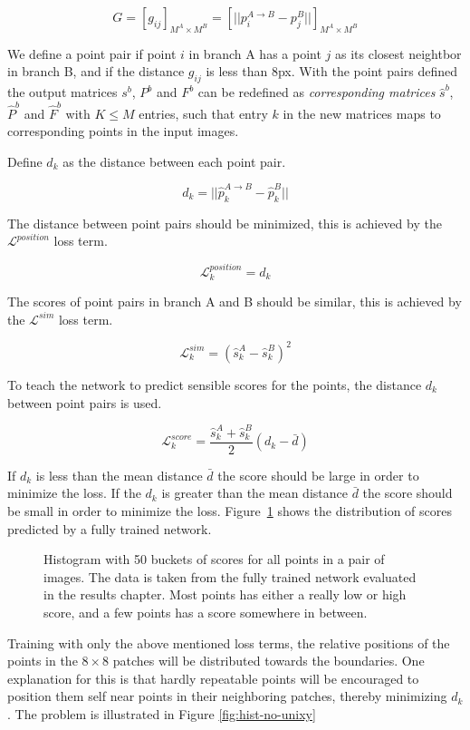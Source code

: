 \[
G=[g_{ij}]_{M^A\times M^B}=\left[||p_i^{A\rightarrow B}-p_j^B||\right]_{M^A\times M^B}
\]

We define a point pair if point $i$ in branch A has a point $j$ as its closest neightbor in branch B, and if the distance $g_{ij}$ is less than 8px. With the point pairs defined the output matrices $s^b$, $P^b$ and $F^b$ can be redefined as \textit{corresponding matrices} $\hat{s}^b$, $\hat{P}^b$ and $\hat{F}^b$ with $K\le M$ entries, such that entry $k$ in the new matrices maps to corresponding points in the input images.

Define $d_k$ as the distance between each point pair.

\[
d_k=||\hat{p}_k^{A\rightarrow B}-\hat{p}_k^B||
\]

The distance between point pairs should be minimized, this is achieved by the $\mathcal{L}^{position}$ loss term.

\[
\mathcal{L}_k^{position} = d_k
\]

The scores of point pairs in branch A and B should be similar, this is achieved by the $\mathcal{L}^{sim}$ loss term.

\[
\mathcal{L}_k^{sim} = \left(\hat{s}_k^{A}-\hat{s}_k^B\right)^2
\]

To teach the network to predict sensible scores for the points, the distance $d_k$ between point pairs is used.

\[
\mathcal{L}_k^{score}=\frac{\hat{s}_k^A+\hat{s}_k^B}{2}\left(d_k-\bar{d}\right)
\]

If $d_k$ is less than the mean distance $\bar{d}$ the score should be large in order to minimize the loss. If the $d_k$ is greater than the mean distance $\bar{d}$ the score should be small in order to minimize the loss. Figure~\ref{fig:score-hist} shows the distribution of scores predicted by a fully trained network.

\begin{figure}[H]
	\begin{center}
		
	\end{center}
	\caption{Histogram with 50 buckets of scores for all points in a pair of images. The data is taken from the fully trained network evaluated in the results chapter. Most points has either a really low or high score, and a few points has a score somewhere in between.}
	\label{fig:score-hist}
\end{figure}

Training with only the above mentioned loss terms, the relative positions of the points in the $8\times 8$ patches will be distributed towards the boundaries. One explanation for this is that hardly repeatable points will be encouraged to position them self near points in their neighboring patches, thereby minimizing $d_k$. The problem is illustrated in Figure \ref{fig:hist-no-unixy}

